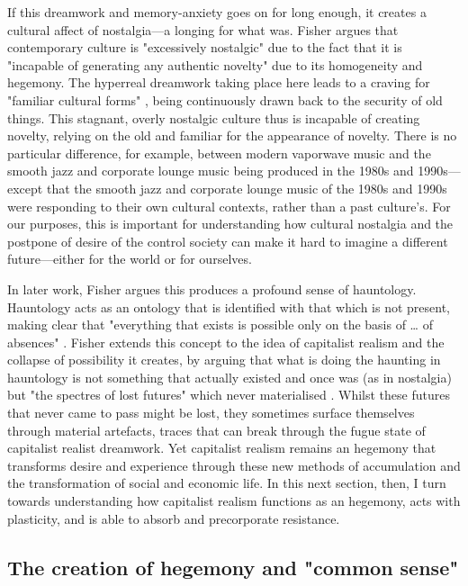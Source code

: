 If this dreamwork and memory-anxiety goes on for long enough, it creates a cultural affect of nostalgia—a longing for what was. Fisher argues that contemporary culture is "excessively nostalgic" due to the fact that it is "incapable of generating any authentic novelty" \citep[p. 63]{fisher_capitalist_2009} due to its homogeneity and hegemony. The hyperreal dreamwork taking place here leads to a craving for "familiar cultural forms" \citep[p. 63]{fisher_capitalist_2009}, being continuously drawn back to the security of old things. This stagnant, overly nostalgic culture thus is incapable of creating novelty, relying on the old and familiar for the appearance of novelty. There is no particular difference, for example, between modern vaporwave music and the smooth jazz and corporate lounge music being produced in the 1980s and 1990s—except that the smooth jazz and corporate lounge music of the 1980s and 1990s were responding to their own cultural contexts, rather than a past culture's. For our purposes, this is important for understanding how  cultural nostalgia and the postpone of desire of the control society can make it hard to imagine a different future—either for the world or for ourselves.

In later work,  Fisher argues this produces a profound sense of hauntology. Hauntology acts as an ontology that is identified with that which is not present, making clear that "everything that exists is possible only on the basis of \ldots{} of absences" \citep[p. 187]{fisher_ghosts_2014}. Fisher extends this concept to the idea of capitalist realism and the collapse of possibility it creates, by arguing that what is doing the haunting in hauntology is not something that actually existed and once was (as in nostalgia) but "the spectres of lost futures" which never materialised \citep[p. 21]{fisher_ghosts_2014}. Whilst these futures that never came to pass might be lost, they sometimes surface themselves through material artefacts, traces that can break through the fugue state of capitalist realist dreamwork. Yet capitalist realism remains an hegemony that transforms desire and experience through these new methods of accumulation and the transformation of social and economic life. In this next section, then, I turn towards understanding how capitalist realism functions as an hegemony, acts with plasticity, and is able to absorb and precorporate resistance.

\subsection{The creation of hegemony and "common sense"}
\label{subsec:the-creation-of-hegemony-and-common-sense}

